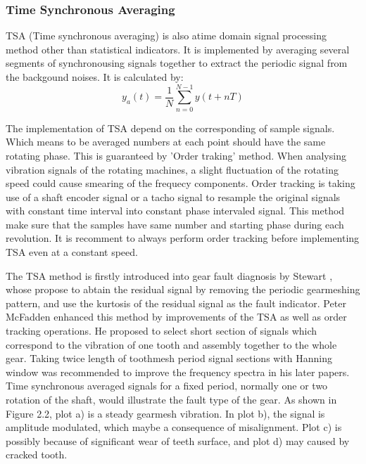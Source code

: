 \subsubsection{Time Synchronous Averaging}

TSA (Time synchronous averaging) is also atime domain signal processing method other than statistical indicators. It is implemented by averaging several segments of synchronousing signals together to extract the periodic signal from the backgound noises. It is calculated by:
\begin{equation}
	y_{a}(t) = \frac{1}{N}\sum_{n=0}^{N-1} y(t+nT)
\end{equation}

The implementation of TSA depend on the corresponding of sample signals. Which means to be averaged numbers at each point should have the same rotating phase. This is guaranteed by 'Order traking' method. When analysing vibration signals of the rotating machines, a slight fluctuation of the rotating speed could cause smearing of the frequecy components. Order tracking is taking use of a shaft encoder signal or a tacho signal to resample the original signals with constant time interval into constant phase intervaled signal. This method make sure that the samples have same number and starting phase during each revolution. It is recomment to always perform order tracking before implementing TSA even at a constant speed.

The TSA method is firstly introduced into gear fault diagnosis by Stewart \cite{stewart}, whose propose to abtain the residual signal by removing the periodic gearmeshing pattern, and use the kurtosis of the residual signal as the fault indicator. Peter McFadden \cite{mc2} enhanced this method by improvements of the TSA as well as order tracking operations. He proposed to select short section of signals which correspond to the vibration of one tooth and assembly together to the whole gear. Taking twice length of toothmesh period signal sections with Hanning window was recommended to improve the frequency spectra in his later papers. \cite{mc3} Time synchronous averaged signals for a fixed period, normally one or two rotation of the shaft, would illustrate the fault type of the gear. As shown in Figure 2.2, plot a) is a steady gearmesh vibration. In plot b), the signal is amplitude modulated, which maybe a consequence of misalignment. Plot c) is possibly because of significant wear of teeth surface, and plot d) may caused by cracked tooth.

